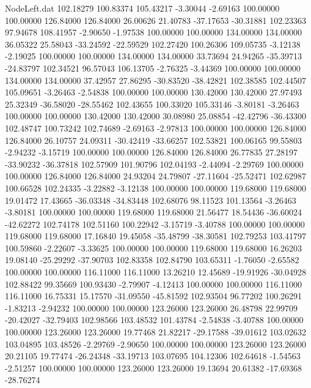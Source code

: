 \begin{filecontents}{NodeLeft.dat}
 102.18279  100.83374  105.43217    -3.30044   -2.69163  100.00000  100.00000  126.84000  126.84000   26.00626   21.40783  -37.17653  -30.31881
 102.23363   97.94678  108.41957    -2.90650   -1.97538  100.00000  100.00000  134.00000  134.00000   36.05322   25.58043  -33.24592  -22.59529
 102.27420  100.26306  109.05735    -3.12138   -2.19025  100.00000  100.00000  134.00000  134.00000   33.73694   24.94265  -35.39713  -24.83797
 102.34521   96.57043  106.13705    -2.76325   -3.44369  100.00000  100.00000  134.00000  134.00000   37.42957   27.86295  -30.83520  -38.42821
 102.38585  102.44507  105.09651    -3.26463   -2.54838  100.00000  100.00000  130.42000  130.42000   27.97493   25.32349  -36.58020  -28.55462
 102.43655  100.33020  105.33146    -3.80181   -3.26463  100.00000  100.00000  130.42000  130.42000   30.08980   25.08854  -42.42796  -36.43300
 102.48747  100.73242  102.74689    -2.69163   -2.97813  100.00000  100.00000  126.84000  126.84000   26.10757   24.09311  -30.42419  -33.66257
 102.53821  100.06165   99.55803    -2.94232   -3.15719  100.00000  100.00000  126.84000  126.84000   26.77835   27.28197  -33.90232  -36.37818
 102.57909  101.90796  102.04193    -2.44094   -2.29769  100.00000  100.00000  126.84000  126.84000   24.93204   24.79807  -27.11604  -25.52471
 102.62987  100.66528  102.24335    -3.22882   -3.12138  100.00000  100.00000  119.68000  119.68000   19.01472   17.43665  -36.03348  -34.83448
 102.68076   98.11523  101.13564    -3.26463   -3.80181  100.00000  100.00000  119.68000  119.68000   21.56477   18.54436  -36.60024  -42.62272
 102.74178  102.51160  100.22942    -3.15719   -3.40788  100.00000  100.00000  119.68000  119.68000   17.16840   19.45058  -35.48799  -38.30581
 102.79253  103.41797  100.59860    -2.22607   -3.33625  100.00000  100.00000  119.68000  119.68000   16.26203   19.08140  -25.29292  -37.90703
 102.83358  102.84790  103.65311    -1.76050   -2.65582  100.00000  100.00000  116.11000  116.11000   13.26210   12.45689  -19.91926  -30.04928
 102.88422   99.35669  100.93430    -2.79907   -4.12413  100.00000  100.00000  116.11000  116.11000   16.75331   15.17570  -31.09550  -45.81592
 102.93504   96.77202  100.26291    -1.83213   -2.94232  100.00000  100.00000  123.26000  123.26000   26.48798   22.99709  -20.42027  -32.79403
 102.98566  103.48532  101.43784    -2.54838   -3.40788  100.00000  100.00000  123.26000  123.26000   19.77468   21.82217  -29.17588  -39.01612
 103.02632  103.04895  103.48526    -2.29769   -2.90650  100.00000  100.00000  123.26000  123.26000   20.21105   19.77474  -26.24348  -33.19713
 103.07695  104.12306  102.64618    -1.54563   -2.51257  100.00000  100.00000  123.26000  123.26000   19.13694   20.61382  -17.69368  -28.76274

\end{filecontents}
